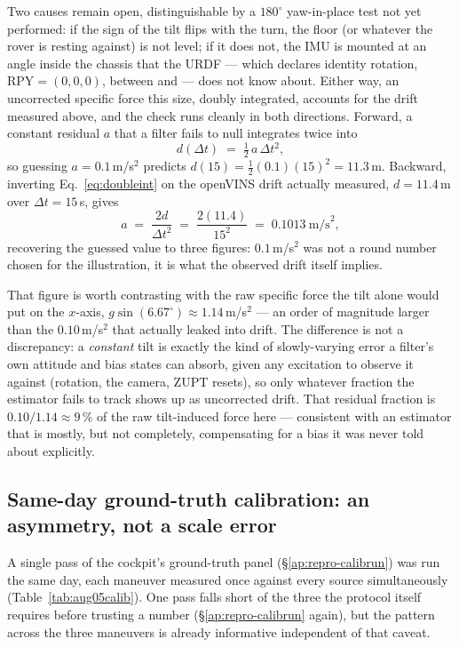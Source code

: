 Two causes remain open, distinguishable by a $180^\circ$ yaw-in-place test not
yet performed: if the sign of the tilt flips with the turn, the floor (or
whatever the rover is resting against) is not level; if it does not, the IMU
is mounted at an angle inside the chassis that the URDF --- which declares
identity rotation, $\text{RPY}=(0,0,0)$, between  and
 --- does not know about. Either way, an uncorrected specific
force this size, doubly integrated, accounts for the drift measured above,
and the check runs cleanly in both directions. Forward, a constant residual
$a$ that a filter fails to null integrates twice into
\begin{equation}
d(\Delta t) \;=\; \tfrac{1}{2}\,a\,\Delta t^2 ,
\label{eq:doubleint}
\end{equation}
so guessing $a=0.1$\,m/s$^2$ predicts $d(15) = \tfrac{1}{2}(0.1)(15)^2 =
11.3$\,m. Backward, inverting Eq.~\ref{eq:doubleint} on the openVINS drift
actually measured, $d=11.4$\,m over $\Delta t=15$\,s, gives
\begin{equation}
a \;=\; \frac{2d}{\Delta t^2} \;=\; \frac{2(11.4)}{15^2} \;=\; 0.1013\ \text{m/s}^2 ,
\label{eq:doubleintinv}
\end{equation}
recovering the guessed value to three figures: $0.1$\,m/s$^2$ was not a
round number chosen for the illustration, it is what the observed drift
itself implies.

That figure is worth contrasting with the raw specific force the tilt
alone would put on the $x$-axis, $g\sin(6.67^\circ) \approx 1.14$\,m/s$^2$
--- an order of magnitude larger than the $0.10$\,m/s$^2$ that actually
leaked into drift. The difference is not a discrepancy: a \emph{constant}
tilt is exactly the kind of slowly-varying error a filter's own attitude
and bias states can absorb, given any excitation to observe it against
(rotation, the camera, ZUPT resets), so only whatever fraction the
estimator fails to track shows up as uncorrected drift. That residual
fraction is $0.10/1.14 \approx 9\,\%$ of the raw tilt-induced force here ---
consistent with an estimator that is mostly, but not completely,
compensating for a bias it was never told about explicitly.

\subsection{Same-day ground-truth calibration: an asymmetry, not a scale
error}
\label{sec:aug05calib}
A single pass of the cockpit's ground-truth panel (\S\ref{ap:repro-calibrun})
was run the same day, each maneuver measured once against every source
simultaneously (Table~\ref{tab:aug05calib}). One pass falls short of the
three the protocol itself requires before trusting a number
(\S\ref{ap:repro-calibrun} again), but the pattern across the three maneuvers
is already informative independent of that caveat.

